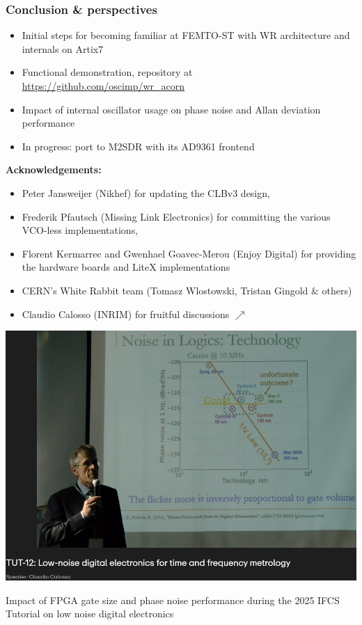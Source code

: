 \documentclass[compress,10pt,aspectratio=169]{beamer}
\begin{document}
\begin{frame}[fragile]\frametitle{Conclusion \& perspectives}

\begin{minipage}[t]{\linewidth}
\begin{minipage}{.55\linewidth}
{\footnotesize
\begin{itemize}
\item Initial steps for becoming familiar at FEMTO-ST with WR architecture and internals on Artix7
\item Functional demonstration, repository at \url{https://github.com/oscimp/wr_acorn}
\item Impact of internal oscillator usage on phase noise and Allan deviation performance
\item In progress: port to M2SDR with its AD9361 frontend
\end{itemize}

\vspace{.41cm}
{\bf Acknowledgements:}
\begin{itemize}
    \item Peter Jansweijer (Nikhef) for updating the CLBv3 design, 
    \item Frederik Pfautsch (Missing Link Electronics) for committing the various VCO-less implementations, 
    \item Florent Kermarrec and Gwenhael Goavec-Merou (Enjoy Digital) for providing the
    hardware boards and LiteX implementations
    \item CERN's White Rabbit team (Tomasz Wlostowski, Tristan Gingold \& others) 
    \item Claudio Calosso (INRIM) for fruitful discussions $\nearrow$
    \end{itemize}
}
\end{minipage}
\begin{minipage}{.49\linewidth}
\includegraphics[width=\linewidth]{figures/2025-05-26-093826_2704x1050_scrot.png}

{\footnotesize
Impact of FPGA gate size and phase noise performance during the
2025 IFCS Tutorial on low noise digital electronics\par
}
\end{minipage}
\end{minipage}
\end{frame}
\end{document}
